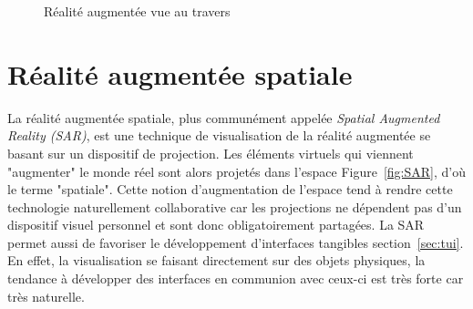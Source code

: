 \begin{figure}[H]
    \centering
\caption{Réalité augmentée vue au travers\protect\footnotemark}
\label{fig:STAR}
\end{figure}

\section{Réalité augmentée spatiale}
La réalité augmentée spatiale\cite{bimber2005spatial}, plus communément appelée \emph{Spatial Augmented Reality (SAR)}, est une technique de visualisation de la réalité augmentée se basant sur un dispositif de projection. Les éléments virtuels qui viennent "augmenter" le monde réel sont alors projetés dans l'espace Figure~\ref{fig:SAR}, d'où le terme "spatiale". Cette notion d'augmentation de l'espace tend à rendre cette technologie naturellement collaborative car les projections ne dépendent pas d'un dispositif visuel personnel et sont donc obligatoirement partagées. La SAR permet aussi de favoriser le développement d'interfaces tangibles section~\ref{sec:tui}. En effet, la visualisation se faisant directement sur des objets physiques, la tendance à développer des interfaces en communion avec ceux-ci est très forte car très naturelle.

